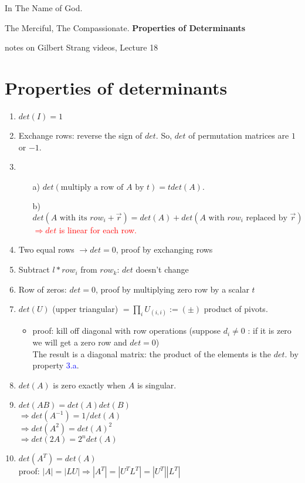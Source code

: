 \documentclass[a4paper,12pt]{article}
\newcommand{\blue}[1]{\textcolor{blue}{#1}}
\newcommand{\red}[1]{\textcolor{red}{#1}}
\begin{document}
\begin{center}
In The Name of God.

The Merciful, The Compassionate.
\vskip 1cm
{\Large\bfseries{Properties of Determinants}}

\vskip 0.2cm
\tiny{notes on Gilbert Strang videos, Lecture 18}
\end{center}

\section{Properties of determinants}
\begin{enumerate}
\item $det(I)=1$

\item Exchange rows: reverse the sign of $det$. So, $det$ of permutation matrices are $1$ or $-1$.

\item 
\begin{itemize}
\item[a)] $det( \text{multiply a row of }A\text{ by }t) = t det(A).$
\item[b)] $ det(A \text{ with its } row_i + \vec{r}) = det(A) + det( A \text{ with } row_i \text{ replaced by } \vec{r})$\\
\red{$\Longrightarrow det $ is linear for each row.}
\end{itemize}
\item Two equal rows $\rightarrow det = 0$, proof by exchanging rows
\item Subtract $l * row_i$ from $row_k$: $det$ doesn't change
\item Row of zeros: $det = 0$, proof by multiplying zero row by a scalar $t$
\item $det(U)$ (upper triangular) $= \prod_i U_{(i,i)} := ( \pm )$ product of pivots.
\begin{itemize}
\item proof: kill off diagonal with row operations (suppose $d_i \neq 0$ : if it is zero we will get a zero row and $det = 0$)\\
The result is a diagonal matrix: the product of the elements is the $det$. by property \blue{3.a}.
\end{itemize}
\item $det(A)$ is zero exactly when $A$ is singular.
\item $det(AB) = det(A)det(B)$\\
$\Rightarrow det(A^{-1}) = 1/det(A)$ \\
$\Rightarrow det(A^2) = det(A)^2$ \\
$\Rightarrow det(2A) = 2^n det(A)$

\item $det(A^T) = det(A)$ \\ 
proof: $|A| = |LU| \Rightarrow |A^T| = |U^T L^T| = |U^T||L^T|$	
\end{enumerate}
\end{document}
